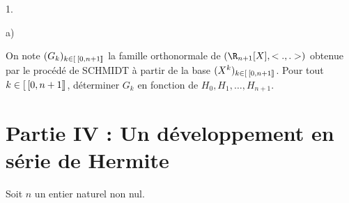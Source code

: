 \documentclass[11pt]{article}%
\begin{document}
\begin{noliste}{1.}
\begin{noliste}{a)}
\item On note $(G_{k})_{k\in {[ \ \hspace{-0.15em}[0,n +
1]\hspace{-0.13em}]}}$
la famille orthonormale de $(\R_{n + 1}[X],<.,.>)$ obtenue par le
procédé de SCHMIDT à partir de la base $(X^{k})_{k\in {[ \
\hspace{-0.15em}[0,n + 1]\hspace{-0.13em}]}}$. Pour tout $k\in {[ \
\hspace{-0.15em}[0,n + 1]\hspace{-0.13em}]}$, déterminer $G_{k}$ en
fonction de $H_{0},H_{1},\ldots
{},H_{n + 1} $.
\end{noliste}
\end{noliste}

\section*{Partie IV : Un développement en série de Hermite}

Soit $n$ un entier naturel non nul.
\end{document}
